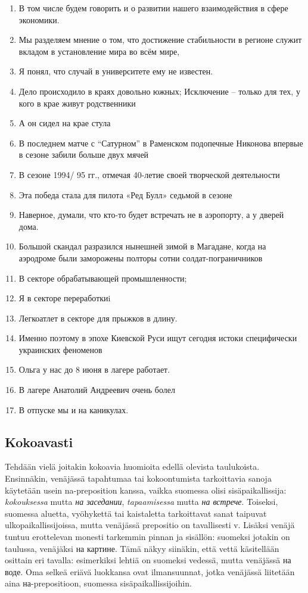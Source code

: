 \documentclass[]{scrreprt}
\providecommand{\tightlist}{%
  \setlength{\itemsep}{0pt}\setlength{\parskip}{0pt}}
\begin{document}
\begin{enumerate}
\def\labelenumi{(\arabic{enumi})}
\setcounter{enumi}{198}
\tightlist
\item
  В том числе будем говорить и о развитии нашего взаимодействия в сфере
  экономики.
\item
  Мы разделяем мнение о том, что достижение стабильности в регионе
  служит вкладом в установление мира во всём мире,
\item
  Я понял, что случай в университете ему не известен.
\item
  Дело происходило в краях довольно южных; Исключение -- только для тех,
  у кого в крае живут родственники
\item
  А он сидел на крае стула
\item
  В последнем матче с ``Сатурном'' в Раменском подопечные Никонова
  впервые в сезоне забили больше двух мячей
\item
  В сезоне 1994/ 95 гг., отмечая 40-летие своей творческой деятельности
\item
  Эта победа стала для пилота «Ред Булл» седьмой в сезоне
\item
  Наверное, думали, что кто-то будет встречать не в аэропорту, а у
  дверей дома.
\item
  Большой скандал разразился нынешней зимой в Магадане, когда на
  аэродроме были заморожены полторы сотни солдат-пограничников
\item
  В секторе обрабатывающей промышленности;
\item
  Я в секторе переработкиi
\item
  Легкоатлет в секторе для прыжков в длину.
\item
  Именно поэтому в эпохе Киевской Руси ищут сегодня истоки специфически
  украинских феноменов
\item
  Ольга у нас до 8 июня в лагере работает.
\item
  В лагере Анатолий Андреевич очень болел
\item
  В отпуске мы и на каникулах.
\end{enumerate}

\subsection{Kokoavasti}\label{kokoavasti}

Tehdään vielä joitakin kokoavia huomioita edellä olevista taulukoista.
Ensinnäkin, venäjässä tapahtumaa tai kokoontumista tarkoittavia sanoja
käytetään usein na-preposition kanssa, vaikka suomessa olisi
sisäpaikallissija: \emph{kokouksessa} mutta \emph{на заседании},
\emph{tapaamisessa} mutta \emph{на встрече}. Toiseksi, suomessa aluetta,
vyöhykettä tai kaistaletta tarkoittavat sanat taipuvat
ulkopaikallissijoissa, mutta venäjässä prepositio on tavallisesti v.
Lisäksi venäjä tuntuu erottelevan monesti tarkemmin pinnan ja sisällön:
suomeksi jotakin on taulussa, venäjäksi на картине. Tämä näkyy siinäkin,
että vettä käsitellään osittain eri tavalla: esimerkiksi lehtiä on
suomeksi vedessä, mutta venäjässä на воде. Oma selkeä eriävä luokkansa
ovat ilmansuunnat, jotka venäjässä liitetään aina на-prepositioon,
suomessa sisäpaikallissijoihin.
\end{document}
